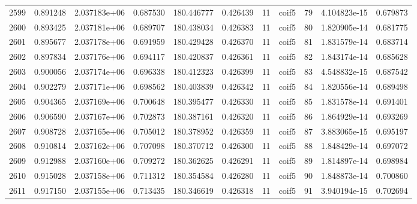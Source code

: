 \begin{tabular}{lrrrrrrlrrr}
2599 &    0.891248 &        2.037183e+06 &  0.687530 &              180.446777 &    0.426439 &      11 &        coif5 &     79 &   4.104823e-15 &      0.679873 \\
2600 &    0.893425 &        2.037181e+06 &  0.689707 &              180.438034 &    0.426383 &      11 &        coif5 &     80 &   1.820905e-14 &      0.681775 \\
2601 &    0.895677 &        2.037178e+06 &  0.691959 &              180.429428 &    0.426370 &      11 &        coif5 &     81 &   1.831579e-14 &      0.683714 \\
2602 &    0.897834 &        2.037176e+06 &  0.694117 &              180.420837 &    0.426361 &      11 &        coif5 &     82 &   1.843174e-14 &      0.685628 \\
2603 &    0.900056 &        2.037174e+06 &  0.696338 &              180.412323 &    0.426399 &      11 &        coif5 &     83 &   4.548832e-15 &      0.687542 \\
2604 &    0.902279 &        2.037171e+06 &  0.698562 &              180.403839 &    0.426342 &      11 &        coif5 &     84 &   1.820556e-14 &      0.689498 \\
2605 &    0.904365 &        2.037169e+06 &  0.700648 &              180.395477 &    0.426330 &      11 &        coif5 &     85 &   1.831578e-14 &      0.691401 \\
2606 &    0.906590 &        2.037167e+06 &  0.702873 &              180.387161 &    0.426320 &      11 &        coif5 &     86 &   1.864929e-14 &      0.693269 \\
2607 &    0.908728 &        2.037165e+06 &  0.705012 &              180.378952 &    0.426359 &      11 &        coif5 &     87 &   3.883065e-15 &      0.695197 \\
2608 &    0.910814 &        2.037162e+06 &  0.707098 &              180.370712 &    0.426300 &      11 &        coif5 &     88 &   1.848429e-14 &      0.697072 \\
2609 &    0.912988 &        2.037160e+06 &  0.709272 &              180.362625 &    0.426291 &      11 &        coif5 &     89 &   1.814897e-14 &      0.698984 \\
2610 &    0.915028 &        2.037158e+06 &  0.711312 &              180.354584 &    0.426280 &      11 &        coif5 &     90 &   1.848873e-14 &      0.700860 \\
2611 &    0.917150 &        2.037155e+06 &  0.713435 &              180.346619 &    0.426318 &      11 &        coif5 &     91 &   3.940194e-15 &      0.702694 \\

\end{tabular}
